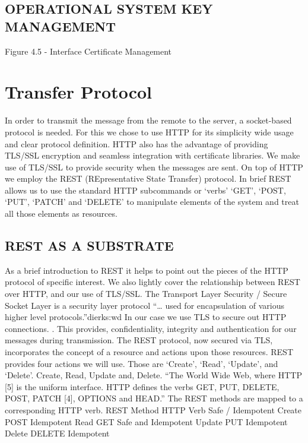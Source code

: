 \subsection{OPERATIONAL SYSTEM KEY MANAGEMENT}
     
     Figure 4.5 - Interface Certificate Management

\section{Transfer Protocol}
     In order to transmit the message from the remote to the server, a socket-based protocol is needed. For this we chose to use HTTP for its simplicity wide usage and clear protocol definition. \cite{Moore:we, Fielding:eSmSU8EF} 
     HTTP also has the advantage of providing TLS/SSL encryption and seamless integration with certificate libraries. We make use of TLS/SSL to provide security when the messages are sent. 
     On top of HTTP we employ the REST (REpresentative State Transfer) protocol. \cite{Fielding:2000dd}  In brief REST allows us to use the standard HTTP subcommands or ‘verbs’ ‘GET’, ‘POST, ‘PUT’, ‘PATCH’ and ‘DELETE’ to manipulate elements of the system and treat all those elements as resources. 
\subsection{REST AS A SUBSTRATE}
     As a brief introduction to REST it helps to point out the pieces of the HTTP protocol of specific interest. We also lightly cover the relationship between REST over HTTP, and our use of TLS/SSL.   
     The Transport Layer Security / Secure Socket Layer is a security layer protocol “… used for encapsulation of various higher level protocols.”{dierks:wd}  In our case  we use TLS to secure out HTTP connections. \cite{Rescorla:2000tv}.  This provides, confidentiality, integrity and authentication for our messages during transmission. 
     The REST protocol, now secured via TLS, incorporates the concept of a resource and actions upon those resources. REST provides four actions we will use.  Those are ‘Create’, ‘Read’, ‘Update’, and ‘Delete’.  
     Create, Read, Update and, Delete.  
     “The World Wide Web, where HTTP [5] is the uniform interface. HTTP defines the verbs GET, PUT, DELETE, POST, PATCH [4], OPTIONS and HEAD.” 
      The REST methods are mapped to a corresponding HTTP verb.  \cite{Fielding:2000dd}
      REST Method HTTP Verb Safe / Idempotent
      Create  POST  Idempotent
      Read  GET Safe and Idempotent
      Update  PUT Idempotent
      Delete  DELETE  Idempotent



